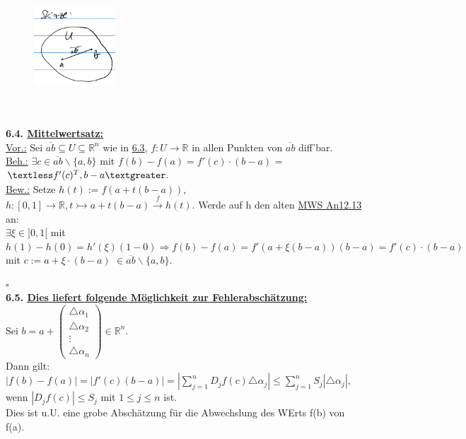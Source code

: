 \documentclass[]{scrartcl}
\begin{document}
\begin{figure}[h]
	\includegraphics[width=3 cm,height=3cm]{bsp kap 6.3}
\end{figure}\\
\\
\textbf{6.4. \ul{Mittelwertsatz:}}\\
\underline{Vor.:} Sei $\overline{ab}\subseteq U\subseteq \mathbb{R}^n$ wie in 
\ul{6.3}, $f:U\rightarrow\mathbb{R}$ in allen Punkten von 
$\overline{ab}$ diff'bar.\\
\underline{Beh.:} \ul{$\exists c \in 
\overline{ab}\backslash\{a,b\}$} mit \ul{$f(b)-f(a)=f'(c)\cdot(b-a)$} = 
$\textless f'(c)^T, b-a\textgreater.$\\
\underline{Bew.:} Setze \ul{$h(t):=f(a+t(b-a))$}, 
$h:[0,1]\rightarrow\mathbb{R}, t\rightarrowtail a +t(b-a)\xrightarrow{f} h(t).$ 
Werde auf h den alten \ul{MWS An12.13} an:\\
$\exists \xi \in ]0,1[$ mit $h(1)-h(0)=h'(\xi)(1-0) \Rightarrow f(b)-f(a)= 
f'(a+\xi(b-a))(b-a)=f'(c)\cdot(b-a)$\\
mit \ul{$c:=a+\xi\cdot(b-a)$} 
$\in\overline{ab}\backslash\{a,b\}$.\\
\strut\hfill$\square$\\
\textbf{6.5. \underline{Dies liefert folgende Möglichkeit zur 
Fehlerabschätzung:}}\\
Sei $b=a+\begin{pmatrix}
	\triangle\alpha_1\\\triangle\alpha_2\\\vdots\\\triangle\alpha_n
\end{pmatrix}\in\mathbb{R}^n.$\\
Dann gilt: 
$|f(b)-f(a)|=|f'(c)(b-a)|=|\sum_{j=1}^{n}D_jf(c)\triangle\alpha_j|\leq\sum_{j=1}^{n}
S_j|\triangle\alpha_j|,$\\
wenn $|D_jf(c)|\leq S_j$ mit $1\leq j\leq n$ ist.\\
Dies ist u.U. eine grobe Abschätzung für die Abwechslung des WErts f(b) von 
f(a).\\
\\
\end{document}
